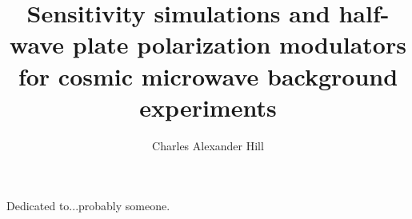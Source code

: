 \documentclass{Other/ucbthesis}
\begin{document}

\title{Sensitivity simulations and half-wave plate polarization modulators for cosmic microwave background experiments}
\author{Charles Alexander Hill}

\maketitle
\approvalpage
\copyrightpage



\begin{frontmatter}

\begin{dedication}
\null\vfil
\begin{center}
Dedicated to...probably someone.
\end{center}
\vfil\null
\end{dedication}


\tableofcontents
\clearpage
\listoffigures
\clearpage
\listoftables



\end{frontmatter}

\pagestyle{headings}






\end{document}
